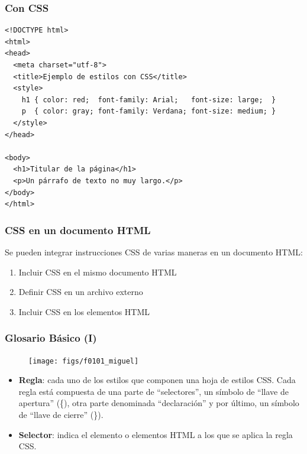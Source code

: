 \documentclass[ucs]{beamer}
\begin{document}

\begin{frame}[fragile]
\frametitle{Con CSS}

{\footnotesize
\begin{verbatim}
<!DOCTYPE html>
<html>
<head>
  <meta charset="utf-8">
  <title>Ejemplo de estilos con CSS</title>
  <style>
    h1 { color: red;  font-family: Arial;   font-size: large;  }
    p  { color: gray; font-family: Verdana; font-size: medium; }
  </style>
</head>
 
<body>
  <h1>Titular de la página</h1>
  <p>Un párrafo de texto no muy largo.</p>
</body>
</html>
\end{verbatim}
}

\end{frame}


\begin{frame}
\frametitle{CSS en un documento HTML}

Se pueden integrar instrucciones CSS de varias maneras en un documento
HTML:

\begin{enumerate}
  \item Incluir CSS en el mismo documento HTML
  \item Definir CSS en un archivo externo
  \item Incluir CSS en los elementos HTML
\end{enumerate}

\end{frame}


\begin{frame}
\frametitle{Glosario Básico (I)}

\begin{center}
\begin{figure}[p]
\texttt{[image: figs/f0101\_miguel]}
\end{figure}
\end{center}

\begin{itemize}
  \item {\bf Regla}: cada uno de los estilos que componen una hoja de estilos CSS. Cada regla está compuesta de una parte de ``selectores'', un símbolo de ``llave de apertura'' (\{), otra parte denominada ``declaración'' y por último, un símbolo de ``llave de cierre'' (\}).
  \item {\bf Selector}: indica el elemento o elementos HTML a los que se aplica la regla CSS.
\end{itemize}

\end{frame}
\end{document}
